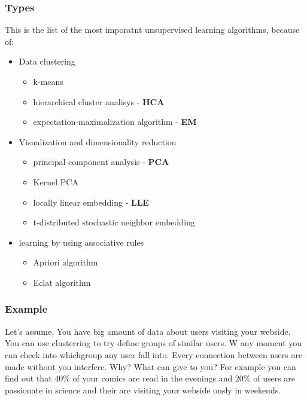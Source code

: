 \documentclass{article}
\begin{document}
    \subsubsection{Types}
    This is the list of the most imporatnt unsupervised learning algorithms, because of:
      \begin{itemize}
        \item Data clustering
          \begin{itemize}
            \item k-means
            \item hierarchical cluster analisys - \textbf{HCA}
            \item expectation-maximalization algorithm - \textbf{EM}
          \end{itemize}
        \item Visualization and dimensionality reduction
          \begin{itemize}
            \item principal component analysis - \textbf{PCA}
            \item Kernel PCA
            \item locally linear embedding - \textbf{LLE}
            \item t-distributed stochastic neighbor embedding
          \end{itemize}
        \item learning by using associative rules
          \begin{itemize}
            \item Apriori algorithm
            \item Eclat algorithm
          \end{itemize}
      \end{itemize}

    \subsubsection{Example}

      Let's assume, You have big amount of data about users visiting your 
    webside. You can use clusterring to try define groups of similar users. W any moment you can check into whichgroup any user fall into. Every connection between users are made without you interfere. Why? What can give to you? For example you can find out that 40\% of your comics are read in the evenings and 20\% of users are passionate in science and their are visiting your webside  onsly in weekends.
\end{document}
